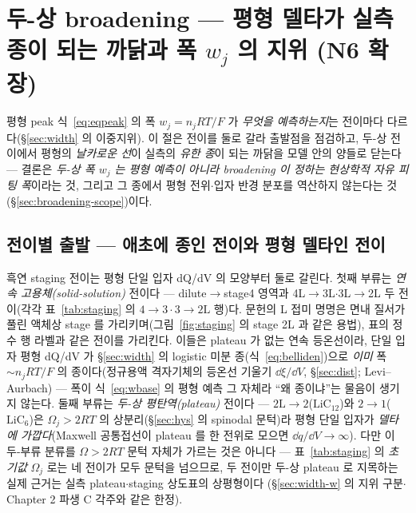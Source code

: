 \section{두-상 broadening --- 평형 델타가 실측 종이 되는 까닭과 폭 $w_j$ 의 지위 (N6 확장)}\label{sec:broadening}
평형 peak 식~\eqref{eq:eqpeak} 의 폭 $w_j=n_jRT/F$ 가 \emph{무엇을 예측하는지}는 전이마다 다르다(\S\ref{sec:width}
의 이중지위). 이 절은
전이를 둘로 갈라 출발점을 점검하고, 두-상 전이에서 평형의 \emph{날카로운 선}이 실측의 \emph{유한 종}이 되는
까닭을 모델 안의 양들로 닫는다 --- 결론은 \emph{두-상 폭 $w_j$ 는 평형 예측이 아니라 broadening 이 정하는
현상학적 자유 피팅 폭}이라는 것, 그리고 그 종에서 평형 전위$\cdot$입자 반경 분포를 역산하지 않는다는
것(\S\ref{sec:broadening-scope})이다.

\subsection{전이별 출발 --- 애초에 종인 전이와 평형 델타인 전이}\label{sec:broadening-class}
흑연 staging 전이는 평형 단일 입자 dQ/dV 의 모양부터
둘로 갈린다. 첫째 부류는 \emph{연속 고용체(solid-solution)} 전이다 --- dilute$\to$stage4 영역과
4L$\to$3L$\cdot$3L$\to$2L 두 전이(각각 표~\ref{tab:staging} 의 $4\!\to\!3\cdot3\!\to\!2\mathrm L$ 행)다. 문헌의 L 접미 명명은 면내 질서가 풀린
액체상 stage 를 가리키며(그림~\ref{fig:staging} 의 stage 2L 과 같은 용법), 표의 정수 행 라벨과 같은 전이를
가리킨다. 이들은 plateau 가 없는 연속 등온선이라\cite{rsc2021}, 단일 입자 평형 dQ/dV 가 \S\ref{sec:width} 의 logistic 미분
종(식~\eqref{eq:belliden})으로 \emph{이미} 폭 $\sim n_jRT/F$ 의 종이다(정규용액 격자기체의 등온선 기울기
$\dd\xi/\dd V$, \S\ref{sec:dist}; Levi--Aurbach\cite{leviaurbach1999}) --- 폭이 식~\eqref{eq:wbase} 의 평형
예측 그 자체라 ``왜 종이냐''는 물음이 생기지 않는다. 둘째 부류는 \emph{두-상 평탄역(plateau)} 전이다 ---
$2\mathrm L\!\to\!2$($\mathrm{LiC_{12}}$)와 $2\!\to\!1$($\mathrm{LiC_6}$)은 $\Omega_j>2RT$ 의 상분리(\S\ref{sec:hys}
의 spinodal 문턱)라 평형 단일 입자가 \emph{델타에 가깝다}(Maxwell 공통접선이 plateau 를 한 전위로 모으면
$\dd q/\dd V\!\to\!\infty$). 다만 이 두-부류 분류를 $\Omega>2RT$ 문턱 자체가 가르는 것은 아니다 ---
표~\ref{tab:staging} 의 \emph{초기값} $\Omega_j$ 로는 네 전이가 모두 문턱을 넘으므로, 두 전이만 두-상
plateau 로 지목하는 실제 근거는 실측 plateau$\cdot$staging 상도표의 상평형이다\cite{dahn1991,ohzuku1993}
(\S\ref{sec:width-w} 의 지위 구분$\cdot$Chapter 2 파생 C 각주와 같은 한정).

